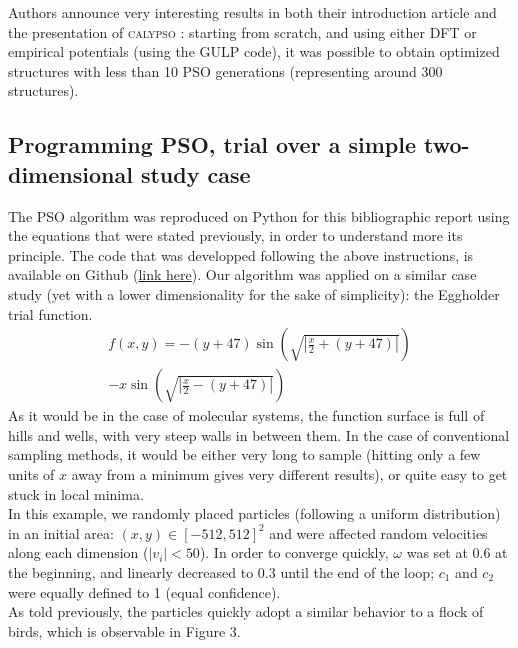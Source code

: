 \documentclass[11pt]{article}
\begin{document}
\begin{multicols}{2}
Authors announce very interesting results in both their introduction article and the presentation of \textsc{calypso} \cite{PhysRevB.82.094116,WANG20122063}: starting from scratch, and using either DFT or empirical potentials (using the GULP code), it was possible to obtain optimized structures with less than 10 PSO generations (representing around 300 structures).
\subsection*{Programming PSO, trial over a simple two-dimensional study case}
The PSO algorithm was reproduced on Python for this bibliographic report using the equations that were stated previously, in order to understand more its principle. The code that was developped following the above instructions, is available on Github (\href{https://github.com/antoinegslr/ParticleSwarnOptimization}{link here}). Our algorithm was applied on a similar case study (yet with a lower dimensionality for the sake of simplicity): the Eggholder trial function.
\begin{multline*}
    f(x,y)=-(y+47)\sin\left(\sqrt{\left|\frac{x}{2}+(y+47)\right|}\right)\\-x\sin\left(\sqrt{\left|\frac{x}{2}-(y+47)\right|}\right)
\end{multline*}
As it would be in the case of molecular systems, the function surface is full of hills and wells, with very steep walls in between them. In the case of conventional sampling methods, it would be either very long to sample (hitting only a few units of $x$ away from a minimum gives very different results), or quite easy to get stuck in local minima.\\
In this example, we randomly placed particles (following a uniform distribution) in an initial area: $(x,y)\in\left[-512,512\right]^2$ and were affected random velocities along each dimension ($|v_i|<50$). In order to converge quickly, $\omega$ was set at 0.6 at the beginning, and linearly decreased to 0.3 until the end of the loop; $c_1$ and $c_2$ were equally defined to 1 (equal confidence).\\
As told previously, the particles quickly adopt a similar behavior to a flock of birds, which is observable in Figure 3.
\bigskip


\end{multicols}
\end{document}
